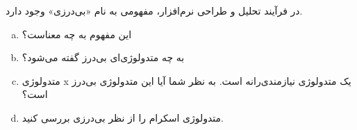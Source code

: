  در فرآیند تحلیل و طراحی نرم‌افزار، مفهومی به نام «بی‌درزی» وجود دارد.
\begin{enumerate}[a)]
	\item 
این مفهوم به چه معناست؟
	 \item 
به چه متدولوژی‌ای بی‌درز گفته می‌شود؟
	\item
متدولوژی x یک متدولوژی نیازمندی‌رانه است. به نظر شما آیا این متدولوژی بی‌درز است؟
	\item
متدولوژی اسکرام را از نظر بی‌درزی بررسی کنید.
\end{enumerate}

